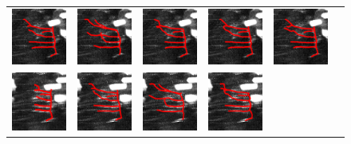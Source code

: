 \documentclass{article}
\begin{document}
\begin{figure}[t!]
\begin{tabular}{cccccc}
		{\includegraphics[width=2cm]{img/all_t2.png}} &
		{\includegraphics[width=2cm]{img/dyna_t2.png}} &
		{\includegraphics[width=2cm]{img/tran_t2.png}} &  
		{\includegraphics[width=2cm]{img/repul_t2.png}} &  
		{\includegraphics[width=2cm]{img/shape_t2.png}}  \\
		{\includegraphics[width=2cm]{img/gt_t3.png}} &
		{\includegraphics[width=2cm]{img/all_t3.png}} &
		{\includegraphics[width=2cm]{img/dyna_t3.png}} &
		{\includegraphics[width=2cm]{img/tran_t3.png}} &  

\end{tabular}
\end{figure}
\end{document}
